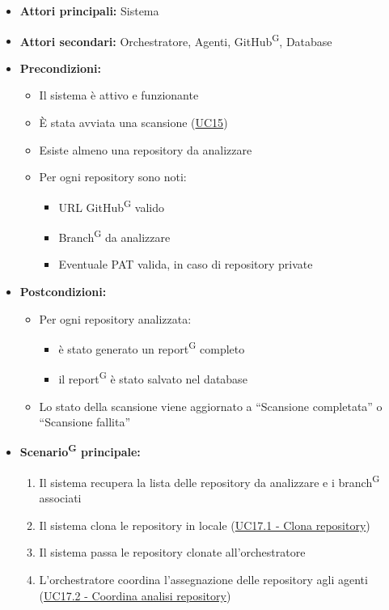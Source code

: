\documentclass[a4paper, 11pt]{article}
\begin{document}
\begin{itemize}
	\item \textbf{Attori principali:} Sistema
	\item \textbf{Attori secondari:} Orchestratore, Agenti, GitHub\textsuperscript{G}, Database
	\item \textbf{Precondizioni:}
	\begin{itemize}
		\item Il sistema è attivo e funzionante
		\item È stata avviata una scansione (\hyperref[UC15]{UC15})
		\item Esiste almeno una repository da analizzare
		\item Per ogni repository sono noti:
		\begin{itemize}
			\item URL GitHub\textsuperscript{G} valido
			\item Branch\textsuperscript{G} da analizzare
			\item Eventuale PAT valida, in caso di repository private
		\end{itemize}
	\end{itemize}
	\item \textbf{Postcondizioni:} 
	\begin{itemize}
		\item Per ogni repository analizzata:
		\begin{itemize}
			\item è stato generato un report\textsuperscript{G} completo
			\item il report\textsuperscript{G} è stato salvato nel database
		\end{itemize}
		\item Lo stato della scansione viene aggiornato a “Scansione completata” o “Scansione fallita”
	\end{itemize}
	\item \textbf{Scenario\textsuperscript{G} principale:}
	\begin{enumerate}
		\item Il sistema recupera la lista delle repository da analizzare e i branch\textsuperscript{G} associati
		\item Il sistema clona le repository in locale (\hyperref[UC17.1]{UC17.1 - Clona repository})
		\item Il sistema passa le repository clonate all'orchestratore
		\item L'orchestratore coordina l'assegnazione delle repository agli agenti (\hyperref[UC17.2]{UC17.2 - Coordina analisi repository})

\end{enumerate}
\end{itemize}
\end{document}
